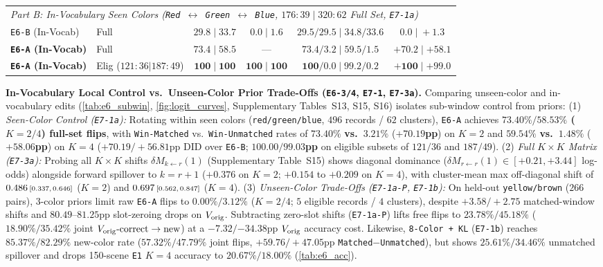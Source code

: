 \begin{table}[!t]
{\begin{tabular}{l l c c c c}
    \midrule
    \multicolumn{6}{l}{\emph{Part B: In-Vocabulary Seen Colors (\texttt{Red $\leftrightarrow$ Green $\leftrightarrow$ Blue}, $176{:}39 \;|\; 320{:}62$ Full Set, \texttt{E7-1a})}} \\
    \texttt{E6-B} (In-Vocab) & Full & $29.8 \;|\; 33.7$ & $0.0 \;|\; 1.6$ & $29.5/29.5 \;|\; 34.8/33.6$ & $0.0 \;|\; +1.3$ \\
    \rowcolor{resulttint}
    \textbf{\texttt{E6-A} (In-Vocab)} & Full & $\mathbf{73.4} \;|\; \mathbf{58.5}$ & $\text{—}$ & $\mathbf{73.4}/3.2 \;|\; \mathbf{59.5}/1.5$ & $\mathbf{+70.2} \;|\; \mathbf{+58.1}$ \\
    \rowcolor{resulttint}
    \textbf{\texttt{E6-A} (In-Vocab)} & Elig ($121{:}36|187{:}49$) & $\mathbf{100} \;|\; \mathbf{100}$ & $\mathbf{100} \;|\; \mathbf{100}$ & $\mathbf{100}/0.0 \;|\; \mathbf{99.2}/0.2$ & $\mathbf{+100} \;|\; \mathbf{+99.0}$ \\
    \bottomrule
  \end{tabular}%
  }
\end{table}

\textbf{In-Vocabulary Local Control vs.\ Unseen-Color Prior Trade-Offs (\texttt{E6-3/4}, \texttt{E7-1}, \texttt{E7-3a}).} Comparing unseen-color and in-vocabulary edits (\cref{tab:e6_subwin}, \cref{fig:logit_curves}, Supplementary Tables~S13, S15, S16) isolates sub-window control from priors:
(1) \emph{Seen-Color Control (\texttt{E7-1a}):} Rotating within seen colors (\texttt{red/green/blue}, $496$ records / $62$ clusters), \texttt{E6-A} achieves \textbf{$73.40\%/58.53\%$ ($K{=}2/4$) full-set flips}, with \texttt{Win-Matched} vs.\ \texttt{Win-Unmatched} rates of $\mathbf{73.40\%}$ \textbf{vs.\ }$\mathbf{3.21\%}$ ($\mathbf{+70.19}$\textbf{pp}) on $K=2$ and $\mathbf{59.54\%}$ \textbf{vs.\ }$\mathbf{1.48\%}$ ($\mathbf{+58.06}$\textbf{pp}) on $K=4$ ($+70.19/+56.81$pp DID over \texttt{E6-B}; $\mathbf{100.00}/\mathbf{99.03}$\textbf{pp} on eligible subsets of $121/36$ and $187/49$).
(2) \emph{Full $K\times K$ Matrix (\texttt{E7-3a}):} Probing all $K\times K$ shifts $\delta M_{k \leftarrow r}(1)$ (Supplementary Table~S15) shows diagonal dominance ($\delta M_{r \leftarrow r}(1) \in [+0.21, +3.44]$ log-odds) alongside forward spillover to $k = r+1$ ($+0.376$ on $K=2$; $+0.154$ to $+0.209$ on $K=4$), with cluster-mean max off-diagonal shift of $0.486\ci{0.337}{0.646}$ ($K=2$) and $0.697\ci{0.562}{0.847}$ ($K=4$).
(3) \emph{Unseen-Color Trade-Offs (\texttt{E7-1a-P}, \texttt{E7-1b}):} On held-out \texttt{yellow/brown} ($266$ pairs), 3-color priors limit raw \texttt{E6-A} flips to $0.00\%/3.12\%$ ($K{=}2/4$; $5$ eligible records / $4$ clusters), despite $+3.58/+2.75$ matched-window shifts and $80.49$--$81.25$pp slot-zeroing drops on $V_{\mathrm{orig}}$. Subtracting zero-slot shifts (\texttt{E7-1a-P}) lifts free flips to $23.78\%/45.18\%$ ($18.90\%/35.42\%$ joint $V_{\mathrm{orig}}\text{-correct}\to\text{new}$) at a $-7.32/{-34.38}\text{pp}$ $V_{\mathrm{orig}}$ accuracy cost. Likewise, \texttt{8-Color + KL} (\texttt{E7-1b}) reaches $\mathbf{85.37\%/82.29\%}$ new-color rate ($57.32\%/47.79\%$ joint flips, $+59.76/+47.05$pp \texttt{Matched$-$Unmatched}), but shows $25.61\%/34.46\%$ unmatched spillover and drops 150-scene \texttt{E1} $K=4$ accuracy to $20.67\%/18.00\%$ (\cref{tab:e6_acc}).

